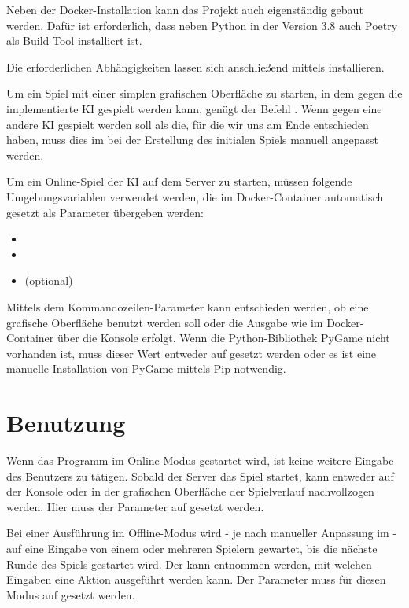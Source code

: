 Neben der Docker-Installation kann das Projekt auch eigenständig gebaut werden.
Dafür ist erforderlich, dass neben Python in der Version 3.8 auch Poetry als Build-Tool installiert ist.

Die erforderlichen Abhängigkeiten lassen sich anschließend mittels  installieren.

Um ein Spiel mit einer simplen grafischen Oberfläche zu starten, in dem gegen die implementierte \ac{KI} gespielt
werden kann, genügt der Befehl .
Wenn gegen eine andere \ac{KI} gespielt werden soll als die, für die wir uns am Ende entschieden haben, muss dies im
 bei der Erstellung des initialen Spiels manuell angepasst werden.

Um ein Online-Spiel der KI auf dem Server zu starten, müssen folgende Umgebungsvariablen verwendet werden, die im
Docker-Container automatisch gesetzt \bzw als Parameter übergeben werden:

\begin{itemize}
	\item {}
	\item {}
	\item {} (optional)
\end{itemize}

Mittels dem Kommandozeilen-Parameter  kann entschieden werden, ob eine grafische Oberfläche
benutzt werden soll oder die Ausgabe wie im Docker-Container über die Konsole erfolgt.
Wenn die Python-Bibliothek PyGame nicht vorhanden ist, muss dieser Wert entweder auf  gesetzt werden oder
es ist eine manuelle Installation von PyGame \bspw mittels Pip notwendig.

\section{Benutzung}
\label{sec:benutzung}

Wenn das Programm im Online-Modus gestartet wird, ist keine weitere Eingabe des Benutzers zu tätigen.
Sobald der Server das Spiel startet, kann entweder auf der Konsole oder in der grafischen Oberfläche der Spielverlauf
nachvollzogen werden.
Hier muss der Parameter  auf  gesetzt werden.

Bei einer Ausführung im Offline-Modus wird - je nach manueller Anpassung im  - auf eine
Eingabe von einem oder mehreren Spielern gewartet, bis die nächste Runde des Spiels gestartet wird.
Der  kann entnommen werden, mit welchen Eingaben eine Aktion ausgeführt werden kann.
Der Parameter  muss für diesen Modus auf  gesetzt werden.

